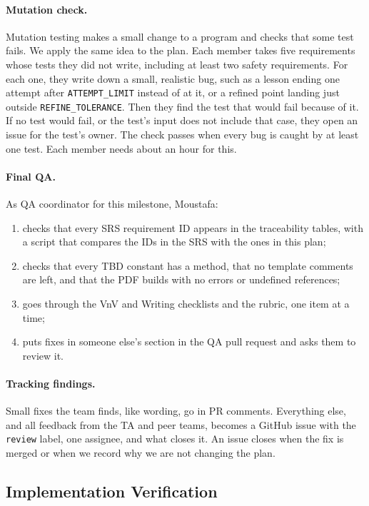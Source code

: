 \documentclass[12pt, titlepage]{article}
\begin{document}
\paragraph{Mutation check.} Mutation testing makes a small change to a program
and checks that some test fails. We apply the same idea to the plan. Each
member takes five requirements whose tests they did not write, including at
least two safety requirements. For each one, they write down a small,
realistic bug, such as a lesson ending one attempt after
\texttt{ATTEMPT\_LIMIT} instead of at it, or a refined point landing just
outside \texttt{REFINE\_TOLERANCE}. Then they find the test that would fail
because of it. If no test would fail, or the test's input does not include
that case, they open an issue for the test's owner. The check passes when
every bug is caught by at least one test. Each member needs about an hour for
this.

\paragraph{Final QA.} As QA coordinator for this milestone, Moustafa:
\begin{enumerate}
  \item checks that every SRS requirement ID appears in the traceability
    tables, with a script that compares the IDs in the SRS with the ones in
    this plan;
  \item checks that every TBD constant has a method, that no template comments
    are left, and that the PDF builds with no errors or undefined references;
  \item goes through the VnV and Writing checklists and the rubric, one item
    at a time;
  \item puts fixes in someone else's section in the QA pull request and asks them
    to review it.
\end{enumerate}

\paragraph{Tracking findings.} Small fixes the team finds, like wording, go in
PR comments. Everything else, and all feedback from the TA and peer teams,
becomes a GitHub issue with the \texttt{review} label, one
assignee, and what closes it. An issue closes when the fix is merged or when
we record why we are not changing the plan.

\subsection{Implementation Verification}
\label{sec:impl-verification}
\end{document}
